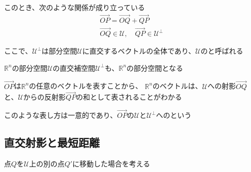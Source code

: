 \documentclass[../../../topic_linear-algebra]{subfiles}
\begin{document}
このとき、次のような関係が成り立っている
\begin{gather*}
  \overrightarrow{OP} = \overrightarrow{OQ} + \overrightarrow{QP} \\
  \overrightarrow{OQ} \in \mathcal{U}, \quad \overrightarrow{QP} \in \mathcal{U}^\perp
\end{gather*}

ここで、$\mathcal{U}^\perp$は部分空間$\mathcal{U}$に直交するベクトルの全体であり、$\mathcal{U}$のと呼ばれる

$\mathbb{R}^n$の部分空間$\mathcal{U}$の直交補空間$\mathcal{U}^\perp$も、$\mathbb{R}^n$の部分空間となる

\br

$\overrightarrow{OP}$は$\mathbb{R}^n$の任意のベクトルを表すことから、
$\mathbb{R}^n$のベクトルは、$\mathcal{U}$への射影$\overrightarrow{OQ}$と、$\mathcal{U}$からの反射影$\overrightarrow{QP}$の和として表されることがわかる

\br

このような表し方は一意的であり、$\overrightarrow{OP}$の$\mathcal{U}$と$\mathcal{U}^\perp$へのという

\subsection{直交射影と最短距離}\label{sec:shortest-distance-projection}

点$Q$を$\mathcal{U}$上の別の点$Q'$に移動した場合を考える
\end{document}
